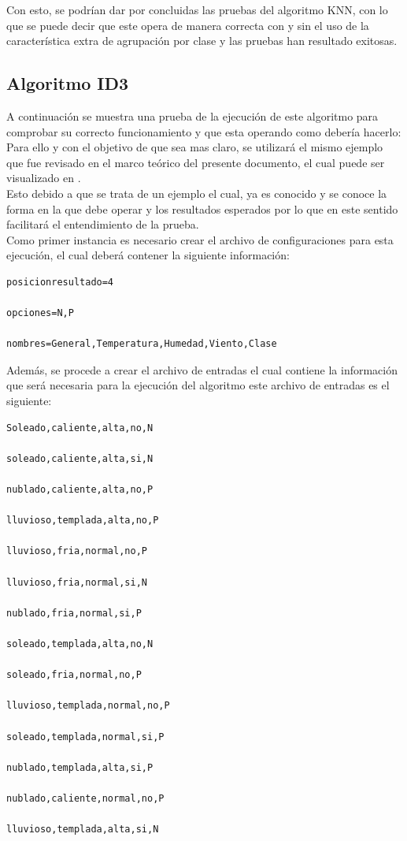 Con esto, se podrían dar por concluidas las pruebas del algoritmo KNN, con lo que se puede decir que este opera de manera correcta con y sin el uso de la característica extra de agrupación por clase y las pruebas han resultado exitosas.
\subsection{Algoritmo ID3}
A continuación se muestra una prueba de la ejecución de este algoritmo para comprobar su correcto funcionamiento y que esta operando como debería hacerlo:
\\
Para ello y con el objetivo de que sea mas claro, se utilizará el mismo ejemplo que fue revisado en el marco teórico del presente documento, el cual puede ser visualizado en .
\\
Esto debido a que se trata de un ejemplo el cual, ya es conocido y se conoce la forma en la que debe operar y los resultados esperados por lo que en este sentido facilitará el entendimiento de la prueba. 
\\
Como primer instancia es necesario crear el archivo de configuraciones para esta ejecución, el cual deberá contener la siguiente información:
\begin{verbatim}
posicionresultado=4

opciones=N,P

nombres=General,Temperatura,Humedad,Viento,Clase
\end{verbatim} 
Además, se procede a crear el archivo de entradas el cual contiene la información que será necesaria para la ejecución del algoritmo este archivo de entradas es el siguiente:
\begin{verbatim}
Soleado,caliente,alta,no,N

soleado,caliente,alta,si,N

nublado,caliente,alta,no,P

lluvioso,templada,alta,no,P

lluvioso,fria,normal,no,P

lluvioso,fria,normal,si,N

nublado,fria,normal,si,P

soleado,templada,alta,no,N

soleado,fria,normal,no,P

lluvioso,templada,normal,no,P

soleado,templada,normal,si,P

nublado,templada,alta,si,P

nublado,caliente,normal,no,P

lluvioso,templada,alta,si,N
\end{verbatim} 
